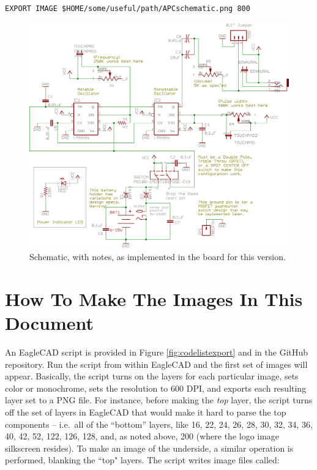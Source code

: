 \documentclass[12pt]{article}
\newcommand{\+}{\item}		%
\newif\ifkey
\begin{document}
\verb|EXPORT IMAGE $HOME/some/useful/path/APCschematic.png 800|

\bigskip

\begin{figure}[hb!]
\begin{center}
\includegraphics[scale=0.9]{APCschembetter.png} %
\end{center}
\caption{Schematic, with notes, as implemented in the board for this version.}
\end{figure}

%
%

\ifkey 

\clearpage
\section{How To Make The Images In This Document}

An EagleCAD script is provided in Figure \ref{fig:codelistexport} and in the GitHub repository. Run the script from within EagleCAD and the first set of images will appear. Basically, the script turns on the layers for each particular image, sets color or monochrome, sets the resolution to 600 DPI, and exports each resulting layer set to a PNG file. For instance, before making the \emph{top} layer, the script turns off the set of layers in EagleCAD that would make it hard to parse the top components -- i.e.~all of the ``bottom'' layers, like 16, 22, 24, 26, 28, 30, 32, 34, 36, 40, 42, 52, 122, 126, 128, and, as noted above, 200 (where the logo image silkscreen resides). To make an image of the underside, a similar operation is performed, blanking the ``top" layers. The script writes image files called:
\end{document}
